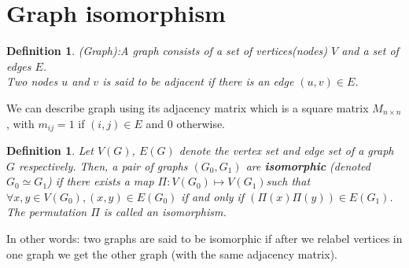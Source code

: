 \documentclass[12pt,a4paper]{article}
\newtheorem{defn}[thm]{Definition}
\begin{document}
\section{Graph isomorphism}
\begin{defn}(Graph)\cite{gross2003handbook:5}:A graph consists of a set of vertices(nodes) $V$ and a set of edges $E$.\\
Two nodes $u$ and $v$ is said to be adjacent if there is an edge $(u,v) \in E$.
\end{defn}
We can describe graph using its adjacency matrix which is a square matrix $M_{n\times n}$, with $m_{ij}=1 $ if $(i,j)\in E$ and $0$ otherwise.     
\begin{defn}
Let $V(G)$, $E(G)$ denote the vertex set and edge set of a graph $G$ respectively. Then, a pair of graphs $(G_0, G_1)$ are \textbf{isomorphic} (denoted $G_0\simeq G_1$) if there exists a map $\Pi:V(G_0)\longmapsto V(G_1)$such that $\forall x,y \in V(G_0), (x,y)\in E(G_0)$ if and only if $(\Pi(x)\Pi(y))\in E(G_1)$. The permutation $\Pi$ is called an isomorphism.\cite{lec-notes1:3}
\end{defn}
In other words: two graphs are said to be isomorphic if after we relabel vertices in one graph we get the other graph (with the same adjacency matrix).
\end{document}
